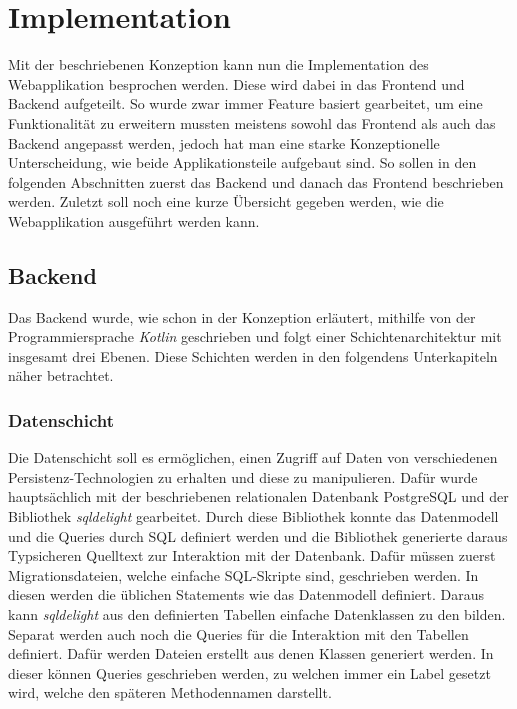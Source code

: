 \chapter{Implementation}

Mit der beschriebenen Konzeption kann nun die Implementation des Webapplikation
besprochen werden. Diese wird dabei in das Frontend und Backend aufgeteilt. So
wurde zwar immer Feature basiert gearbeitet, \dh{} um eine Funktionalität zu
erweitern mussten meistens sowohl das Frontend als auch das Backend angepasst
werden, jedoch hat man eine starke Konzeptionelle Unterscheidung, wie beide
Applikationsteile aufgebaut sind. So sollen in den folgenden Abschnitten
zuerst das Backend und danach das Frontend beschrieben werden. Zuletzt soll noch eine
kurze Übersicht gegeben werden, wie die Webapplikation ausgeführt werden kann.

\section{Backend}

Das Backend wurde, wie schon in der Konzeption erläutert, mithilfe von der
Programmiersprache \emph{Kotlin} geschrieben und folgt einer
Schichtenarchitektur mit insgesamt drei Ebenen. Diese Schichten werden in den
folgendens Unterkapiteln näher betrachtet.

\subsection{Datenschicht}

Die Datenschicht soll es ermöglichen, einen Zugriff auf Daten von verschiedenen
Persistenz-Technologien zu erhalten und diese zu manipulieren. Dafür wurde hauptsächlich
mit der beschriebenen relationalen Datenbank PostgreSQL und der Bibliothek \emph{sqldelight}
gearbeitet. Durch diese Bibliothek konnte das Datenmodell und die Queries durch
SQL definiert werden und die Bibliothek generierte daraus Typsicheren Quelltext zur Interaktion
mit der Datenbank. Dafür müssen zuerst Migrationsdateien, welche einfache SQL-Skripte sind,
geschrieben werden. In diesen werden die üblichen Statements wie 
das Datenmodell definiert. Daraus kann \emph{sqldelight} aus den definierten Tabellen einfache
Datenklassen zu den bilden. Separat werden auch noch die Queries für die Interaktion mit den Tabellen
definiert. Dafür werden Dateien erstellt aus denen  Klassen generiert werden. In dieser
können Queries geschrieben werden, zu welchen immer ein Label gesetzt wird, welche den späteren
Methodennamen darstellt.

